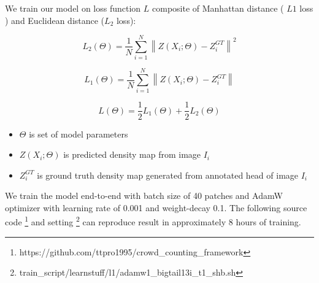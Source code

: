 We train our model on loss function $L$ composite of Manhattan distance ( $L1$ loss ) and Euclidean distance ($L_2$ loss): 

\begin{equation}L_2(\Theta)=\frac{1}{N} \sum_{i=1}^{N}\left\|Z\left(X_{i} ; \Theta\right)-Z_{i}^{G T}\right\|^{2}\end{equation}

\begin{equation}L_1(\Theta)=\frac{1}{N} \sum_{i=1}^{N}\left\|Z\left(X_{i} ; \Theta\right)-Z_{i}^{G T}\right\|\end{equation}

\begin{equation}
    L(\Theta) = \frac{1}{2}L_1(\Theta) + \frac{1}{2}L_2(\Theta)
\end{equation}

\begin{itemize}
  \item $\Theta$ is set of model parameters
  \item $Z\left(X_{i} ; \Theta\right)$ is predicted density map from image $I_i$
  \item $Z_{i}^{G T}$ is ground truth density map generated from annotated head of image $I_i$
\end{itemize}

 
 We train the model end-to-end with batch size of 40 patches and AdamW optimizer \cite{loshchilov2017decoupled} with learning rate of 0.001 and weight-decay 0.1. The following source code \footnote{https://github.com/ttpro1995/crowd\_counting\_framework} and setting \footnote{train\_script/learnstuff/l1/adamw1\_bigtail13i\_t1\_shb.sh} can reproduce result in approximately 8 hours of training.








